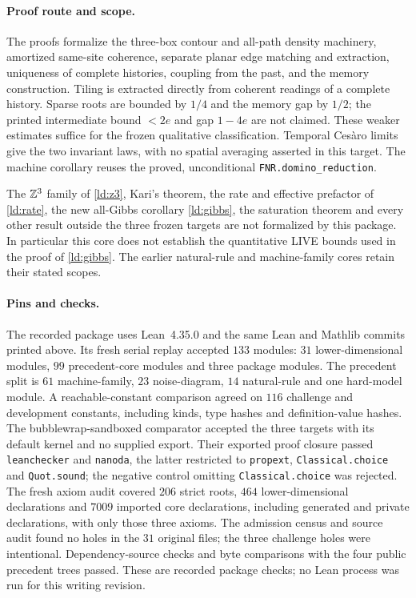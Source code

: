 \paragraph{Proof route and scope.} The proofs formalize the three-box contour and all-path density machinery, amortized same-site coherence, separate planar edge matching and extraction, uniqueness of complete histories, coupling from the past, and the memory construction. Tiling is extracted directly from coherent readings of a complete history. Sparse roots are bounded by $1/4$ and the memory gap by $1/2$; the printed intermediate bound $<2e$ and gap $1-4e$ are not claimed. These weaker estimates suffice for the frozen qualitative classification. Temporal Ces\`aro limits give the two invariant laws, with no spatial averaging asserted in this target. The machine corollary reuses the proved, unconditional \nolinkurl{FNR.domino_reduction}.

The $\mathbb{Z}^3$ family of \cref{ld:z3}, Kari's theorem, the rate and effective prefactor of \cref{ld:rate}, the new all-Gibbs corollary \cref{ld:gibbs}, the saturation theorem and every other result outside the three frozen targets are not formalized by this package. In particular this core does not establish the quantitative LIVE bounds used in the proof of \cref{ld:gibbs}. The earlier natural-rule and machine-family cores retain their stated scopes.

\paragraph{Pins and checks.} The recorded package uses Lean~4.35.0 and the same Lean and Mathlib commits printed above. Its fresh serial replay accepted $133$ modules: $31$ lower-dimensional modules, $99$ precedent-core modules and three package modules. The precedent split is $61$ machine-family, $23$ noise-diagram, $14$ natural-rule and one hard-model module. A reachable-constant comparison agreed on $116$ challenge and development constants, including kinds, type hashes and definition-value hashes. The bubblewrap-sandboxed comparator accepted the three targets with its default kernel and no supplied export. Their exported proof closure passed \texttt{leanchecker} and \texttt{nanoda}, the latter restricted to \texttt{propext}, \texttt{Classical.choice} and \texttt{Quot.sound}; the negative control omitting \texttt{Classical.choice} was rejected. The fresh axiom audit covered $206$ strict roots, $464$ lower-dimensional declarations and $7009$ imported core declarations, including generated and private declarations, with only those three axioms. The admission census and source audit found no holes in the $31$ original files; the three challenge holes were intentional. Dependency-source checks and byte comparisons with the four public precedent trees passed. These are recorded package checks; no Lean process was run for this writing revision.

